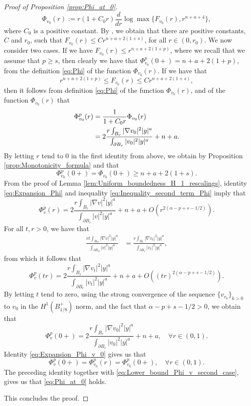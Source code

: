 \documentclass[11pt,reqno]{amsart}
\theoremstyle{definition}
\theoremstyle{remark}
\begin{document}
\begin{proof}[Proof of Proposition \ref{prop:Phi_at_0}]
$$
\Phi_{v_0}(r):=r(1+C_0r) \frac{d}{dr} \log\max\{F_{v_0}(r), r^{n+a+4}\},
$$
where $C_0$ is a positive constant. By \cite[Lemma 6.5]{Caffarelli_Salsa_Silvestre_2008}, we obtain that there are positive constants, $C$ and $r_0$, such that $F_{v_0}(r) \leq Cr^{n+a+2(1+s)}$, for all $r\in (0,r_0)$. We now consider two cases. If we have $F_{v_0}(r) \leq r^{n+a+2(1+p)}$, where we recall that we assume that $p\geq s$, then clearly we have that $\Phi^p_{v_0}(0+)=n+a+2(1+p)$, from the definition \eqref{eq:Phi} of the function $\Phi_{v_0}(r)$. If we have that 
$$
r^{n+a+2(1+p)} \leq F_{v_0}(r) \leq Cr^{n+a+2(1+s)},
$$
then it follows from definition \eqref{eq:Phi} of the function $\Phi_{v_0}(r)$, and \cite[Formula (3.22)]{Caffarelli_Salsa_Silvestre_2008} of the function $\Phi_{v_0}(r)$ that
\begin{align}
\Phi^p_{v_0}(r) &= \frac{1}{1+C_0r} \Phi_{v_0}(r)\notag\\
                \label{eq:Expansion_Phi_v_0} 
                & = 2\frac{r\int_{B_r}|\nabla v_0|^2|y|^a}{\int_{\partial B_r}|v_0|^2|y|^a} +n+a.
\end{align}
By letting $r$ tend to $0$ in the first identity from above, we obtain by Proposition \ref{prop:Monotonicity_formula} and \cite[Lemma 6.1]{Caffarelli_Salsa_Silvestre_2008} that 
\begin{equation}
\label{eq:Lower_bound_Phi_v_second_case}
\Phi^p_{v_0}(0+) = \Phi_{v_0}(0+) \geq n+a+2(1+s).
\end{equation}
From the proof of Lemma \ref{lem:Uniform_boundedness_H_1_rescalings}, identity \eqref{eq:Expansion_Phi} and inequality \eqref{eq:Inequality_second_term_Phi} imply that
$$
\Phi^p_{v}(r) =  2\frac{r\int_{B_r}|\nabla v|^2|y|^a}{\int_{\partial B_r}|v|^2|y|^a} +n+a+ O(r^{2(\alpha-p+s-1/2)}).
$$
For all $t,r>0$, we have that
\begin{align*}
\frac{rt\int_{B_{rt}}|\nabla v|^2|y|^a}{\int_{\partial B_{rt}}|v|^2|y|^a}
&= \frac{r\int_{B_r}|\nabla v_t|^2|y|^a}{\int_{\partial B_r}|v_t|^2|y|^a},
\end{align*}
from which it follows that
$$
\Phi^p_{v}(tr) =  2\frac{r\int_{B_r}|\nabla v_t|^2|y|^a}{\int_{\partial B_r}|v_t|^2|y|^a} +n+a+ O((tr)^{2(\alpha-p+s-1/2)}).
$$
By letting $t$ tend to zero, using the strong convergence of the sequence $\{v_{r_k}\}_{k>0}$ to $v_0$ in the $H^1(B^+_{1/8})$ norm, and the fact that $\alpha-p+s-1/2>0$, we obtain that
$$
\Phi^p_{v}(0+) =  2\frac{r\int_{B_r}|\nabla v_0|^2|y|^a}{\int_{\partial B_r}|v_0|^2|y|^a} +n+a,\quad\forall r\in (0,1).
$$
Identity \eqref{eq:Expansion_Phi_v_0}  gives us that 
\begin{equation}
\label{eq:Homogeneity_v_0} 
\Phi^p_{v}(0+) = \Phi^p_{v_0}(r) = \Phi^p_{v_0}(0+),\quad\forall r\in (0,1).
\end{equation}
The preceding identity together with \eqref{eq:Lower_bound_Phi_v_second_case}, gives us that \eqref{eq:Phi_at_0} holds.

This concludes the proof.
\end{proof}
\end{document}
